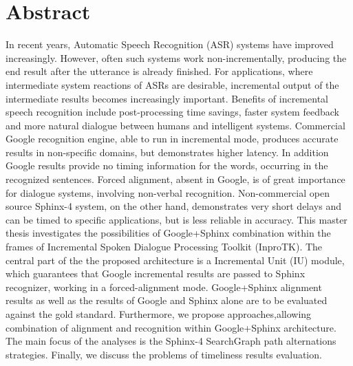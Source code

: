 \chapter*{Abstract}
In recent years, Automatic Speech Recognition (ASR) systems have improved
increasingly. However, often such systems work non-incrementally, producing 
the end result after the utterance is already finished. For applications, where intermediate system reactions of ASRs are desirable,  
incremental output of the intermediate results becomes increasingly important. Benefits of  incremental speech recognition 
include post-processing time savings, faster system feedback and more natural dialogue between humans and intelligent systems. 
Commercial Google recognition engine, able to run in incremental mode, produces accurate results in non-specific domains,
 but demonstrates higher latency. In addition Google results provide no  timing information for the words, occurring in  the recognized sentences. 
 Forced alignment, absent in Google, is of great importance for dialogue systems, involving non-verbal recognition.  
Non-commercial open source Sphinx-4 system, on the other hand, demonstrates very short delays and can be timed to specific applications, but is 
less reliable in accuracy. This master thesis investigates the possibilities of Google+Sphinx combination within the frames of Incremental Spoken Dialogue 
Processing Toolkit (InproTK). The central part of the the proposed architecture is a Incremental Unit (IU) module, which guarantees that Google incremental 
results are passed to Sphinx recognizer, working in a forced-alignment mode. Google+Sphinx alignment results as well as the results of Google and Sphinx 
alone are to be evaluated against the gold standard. Furthermore, we propose approaches,allowing combination of alignment and recognition within  Google+Sphinx 
architecture. The main focus of the analyses is the Sphinx-4 SearchGraph path alternations strategies. 
Finally, we discuss the problems of timeliness results evaluation.

